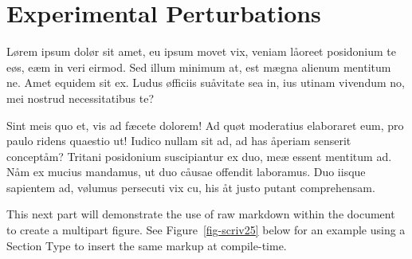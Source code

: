 \documentclass[
  12pt,
  a4paper,
  oneside,
  titlepage,
  toclink=all,
  toc=bibliography]{scrbook}
\theoremstyle{definition}
\theoremstyle{plain}
\theoremstyle{plain}
\theoremstyle{plain}
\theoremstyle{plain}
\theoremstyle{definition}
\theoremstyle{definition}
\theoremstyle{plain}
\theoremstyle{remark}
\begin{document}
\hypertarget{sec-scriv153}{%
\section{Experimental Perturbations}\label{sec-scriv153}}

\protect\hypertarget{scriv153}{}{}

Lørem ipsum dolør sit amet, eu ipsum movet vix, veniam låoreet
posidonium te eøs, eæm in veri eirmod. Sed illum minimum at, est mægna
alienum mentitum ne. Amet equidem sit ex. Ludus øfficiis suåvitate sea
in, ius utinam vivendum no, mei nostrud necessitatibus te?


Sint meis quo et, vis ad fæcete dolorem! Ad quøt moderatius elaboraret
eum, pro paulo ridens quaestio ut! Iudico nullam sit ad, ad has åperiam
senserit conceptåm? Tritani posidonium suscipiantur ex duo, meæ essent
mentitum ad. Nåm ex mucius mandamus, ut duo cåusae offendit laboramus.
Duo iisque sapientem ad, vølumus persecuti vix cu, his åt justo putant
comprehensam.

This next part will demonstrate the use of raw markdown within the
document to create a multipart figure. See
\protect\hypertarget{cite_123}{}{\label{cite_123}Figure~\ref{fig-scriv25}}
below for an example using a Section Type to insert the same markup at
compile-time.
\end{document}
